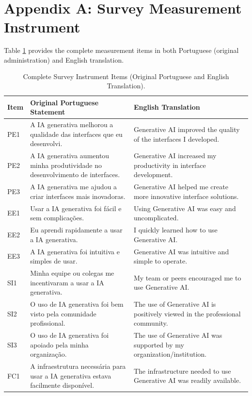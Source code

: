 \documentclass{cleiej}
\begin{document}
\appendix

\section*{Appendix A: Survey Measurement Instrument}
Table \ref{tab:appendix_instrument} provides the complete measurement items in both Portuguese (original administration) and English translation.

\begin{table}[ht]
\centering
\caption{Complete Survey Instrument Items (Original Portuguese and English Translation).}
\label{tab:appendix_instrument}
\footnotesize
\begin{tabularx}{\textwidth}{l p{7.5cm} X}
\toprule
\textbf{Item} & \textbf{Original Portuguese Statement} & \textbf{English Translation} \\
\midrule
PE1 & A IA generativa melhorou a qualidade das interfaces que eu desenvolvi. & Generative AI improved the quality of the interfaces I developed. \\
PE2 & A IA generativa aumentou minha produtividade no desenvolvimento de interfaces. & Generative AI increased my productivity in interface development. \\
PE3 & A IA generativa me ajudou a criar interfaces mais inovadoras. & Generative AI helped me create more innovative interface solutions. \\
\midrule
EE1 & Usar a IA generativa foi fácil e sem complicações. & Using Generative AI was easy and uncomplicated. \\
EE2 & Eu aprendi rapidamente a usar a IA generativa. & I quickly learned how to use Generative AI. \\
EE3 & A IA generativa foi intuitiva e simples de usar. & Generative AI was intuitive and simple to operate. \\
\midrule
SI1 & Minha equipe ou colegas me incentivaram a usar a IA generativa. & My team or peers encouraged me to use Generative AI. \\
SI2 & O uso de IA generativa foi bem visto pela comunidade profissional. & The use of Generative AI is positively viewed in the professional community. \\
SI3 & O uso de IA generativa foi apoiado pela minha organização. & The use of Generative AI was supported by my organization/institution. \\
\midrule
FC1 & A infraestrutura necessária para usar a IA generativa estava facilmente disponível. & The infrastructure needed to use Generative AI was readily available. \\

\end{tabularx}
\end{table}
\end{document}
